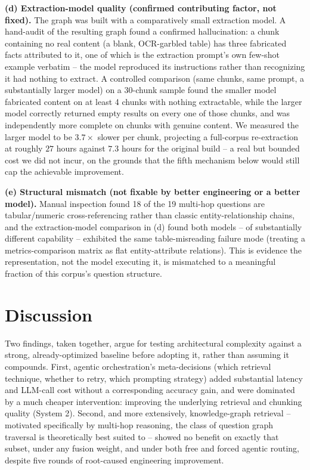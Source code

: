 \documentclass[sigconf,anonymous,review]{acmart}
\begin{document}
\textbf{(d) Extraction-model quality (confirmed contributing factor, not fixed).} The graph was built with a comparatively small extraction model. A hand-audit of the resulting graph found a confirmed hallucination: a chunk containing no real content (a blank, OCR-garbled table) has three fabricated facts attributed to it, one of which is the extraction prompt's own few-shot example verbatim -- the model reproduced its instructions rather than recognizing it had nothing to extract. A controlled comparison (same chunks, same prompt, a substantially larger model) on a 30-chunk sample found the smaller model fabricated content on at least 4 chunks with nothing extractable, while the larger model correctly returned empty results on every one of those chunks, and was independently more complete on chunks with genuine content. We measured the larger model to be $3.7\times$ slower per chunk, projecting a full-corpus re-extraction at roughly $27$ hours against $7.3$ hours for the original build -- a real but bounded cost we did not incur, on the grounds that the fifth mechanism below would still cap the achievable improvement.

\textbf{(e) Structural mismatch (not fixable by better engineering or a better model).} Manual inspection found 18 of the 19 multi-hop questions are tabular/numeric cross-referencing rather than classic entity-relationship chains, and the extraction-model comparison in (d) found both models -- of substantially different capability -- exhibited the same table-misreading failure mode (treating a metrics-comparison matrix as flat entity-attribute relations). This is evidence the representation, not the model executing it, is mismatched to a meaningful fraction of this corpus's question structure.

\section{Discussion}

Two findings, taken together, argue for testing architectural complexity against a strong, already-optimized baseline before adopting it, rather than assuming it compounds. First, agentic orchestration's meta-decisions (which retrieval technique, whether to retry, which prompting strategy) added substantial latency and LLM-call cost without a corresponding accuracy gain, and were dominated by a much cheaper intervention: improving the underlying retrieval and chunking quality (System 2). Second, and more extensively, knowledge-graph retrieval -- motivated specifically by multi-hop reasoning, the class of question graph traversal is theoretically best suited to -- showed no benefit on exactly that subset, under any fusion weight, and under both free and forced agentic routing, despite five rounds of root-caused engineering improvement.
\end{document}
